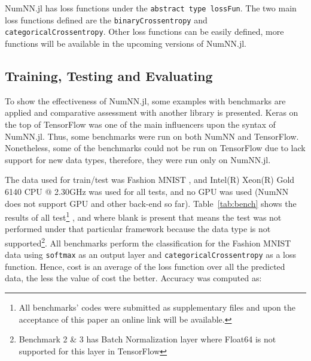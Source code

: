 NumNN.jl has loss functions under the \texttt{abstract type lossFun}. The two main loss functions defined are the \texttt{binaryCrossentropy} and \texttt{categoricalCrossentropy}. Other loss functions can be easily defined, more functions will be available in the upcoming versions of NumNN.jl.


\subsection{Training, Testing and Evaluating}
To show the effectiveness of NumNN.jl, some examples with benchmarks are applied and comparative assessment with another library is presented. Keras \cite{Collet2015} on the top of TensorFlow was one of the main influencers upon the syntax of NumNN.jl. Thus, some benchmarks were run on both NumNN and TensorFlow. Nonetheless, some of the benchmarks could not be run on TensorFlow due to lack support for new data types, therefore, they were run only on NumNN.jl.

The data used for train/test was Fashion MNIST \cite{Xiao2017}, and Intel(R) Xeon(R) Gold 6140 CPU @ 2.30GHz was used for all tests, and no GPU was used (NumNN does not support GPU and other back-end so far). Table~\ref{tab:bench} shows the results of all test\footnote{All benchmarks' codes were submitted as supplementary files and upon the acceptance of this paper an online link will be available.}
, and where blank is present that means the test was not performed under that particular framework because the data type is not supported\footnote{\label{batchnorm}Benchmark 2 \& 3 has Batch Normalization layer where Float64 is not supported for this layer in TensorFlow}. All benchmarks perform the classification for the Fashion MNIST data using \texttt{softmax} as an output layer and \texttt{categoricalCrossentropy} as a loss function. Hence, cost is an average of the loss function over all the predicted data, the less the value of cost the better. Accuracy was computed as:

